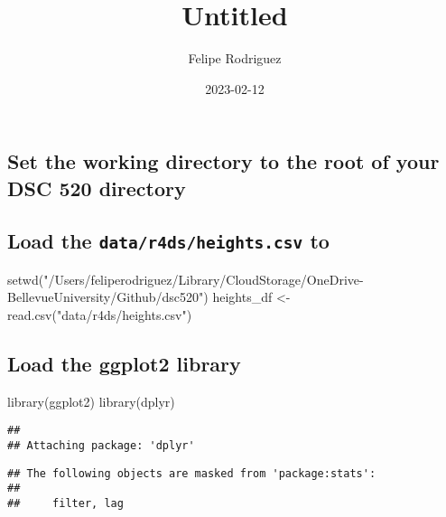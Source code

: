 \documentclass[
]{article}
\title{Untitled}
\author{Felipe Rodriguez}
\date{2023-02-12}
\newenvironment{Shaded}{\begin{snugshade}}{\end{snugshade}}
\newcommand{\FunctionTok}[1]{\textcolor[rgb]{0.00,0.00,0.00}{#1}}
\newcommand{\NormalTok}[1]{#1}
\newcommand{\OtherTok}[1]{\textcolor[rgb]{0.56,0.35,0.01}{#1}}
\newcommand{\StringTok}[1]{\textcolor[rgb]{0.31,0.60,0.02}{#1}}
\begin{document}
\maketitle

\hypertarget{set-the-working-directory-to-the-root-of-your-dsc-520-directory}{%
\subsection{Set the working directory to the root of your DSC 520
directory}\label{set-the-working-directory-to-the-root-of-your-dsc-520-directory}}

\hypertarget{load-the-datar4dsheights.csv-to}{%
\subsection{\texorpdfstring{Load the \texttt{data/r4ds/heights.csv}
to}{Load the data/r4ds/heights.csv to}}\label{load-the-datar4dsheights.csv-to}}

\begin{Shaded}
\begin{Highlighting}[]
\FunctionTok{setwd}\NormalTok{(}\StringTok{"/Users/feliperodriguez/Library/CloudStorage/OneDrive{-}BellevueUniversity/Github/dsc520"}\NormalTok{)}
\NormalTok{heights\_df }\OtherTok{\textless{}{-}} \FunctionTok{read.csv}\NormalTok{(}\StringTok{"data/r4ds/heights.csv"}\NormalTok{)}
\end{Highlighting}
\end{Shaded}

\hypertarget{load-the-ggplot2-library}{%
\subsection{Load the ggplot2 library}\label{load-the-ggplot2-library}}

\begin{Shaded}
\begin{Highlighting}[]
\FunctionTok{library}\NormalTok{(ggplot2)}
\FunctionTok{library}\NormalTok{(dplyr)}
\end{Highlighting}
\end{Shaded}

\begin{verbatim}
## 
## Attaching package: 'dplyr'
\end{verbatim}

\begin{verbatim}
## The following objects are masked from 'package:stats':
## 
##     filter, lag
\end{verbatim}
\end{document}
